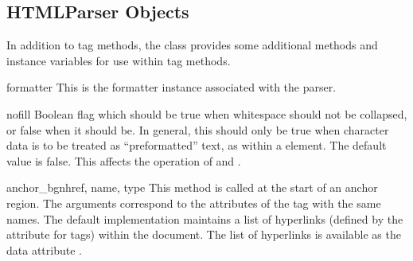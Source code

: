 \begin{seealso}
\end{seealso}


\subsection{HTMLParser Objects \label{html-parser-objects}}

In addition to tag methods, the  class provides some
additional methods and instance variables for use within tag methods.

\begin{memberdesc}{formatter}
This is the formatter instance associated with the parser.
\end{memberdesc}

\begin{memberdesc}{nofill}
Boolean flag which should be true when whitespace should not be
collapsed, or false when it should be.  In general, this should only
be true when character data is to be treated as ``preformatted'' text,
as within a  element.  The default value is false.  This
affects the operation of  and .
\end{memberdesc}


\begin{methoddesc}{anchor_bgn}{href, name, type}
This method is called at the start of an anchor region.  The arguments
correspond to the attributes of the  tag with the same
names.  The default implementation maintains a list of hyperlinks
(defined by the  attribute for  tags) within the
document.  The list of hyperlinks is available as the data attribute
.
\end{methoddesc}

